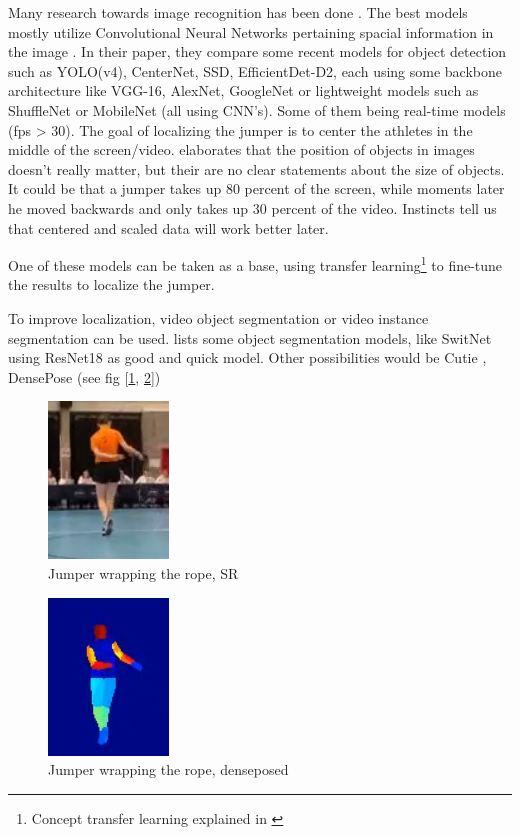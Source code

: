 Many research towards image recognition has been done \autocite{Zou_2023}. The best models mostly utilize Convolutional Neural Networks pertaining spacial information in the image \autocite{Zaidi_2021}. In their paper, they compare some recent models for object detection such as YOLO(v4), CenterNet, SSD, EfficientDet-D2, each using some backbone architecture like VGG-16, AlexNet, GoogleNet or lightweight models such as ShuffleNet or MobileNet (all using CNN's). Some of them being real-time models (fps > 30).
The goal of localizing the jumper is to center the athletes in the middle of the screen/video. \textcite{Bharadiya_2023} elaborates that the position of objects in images doesn't really matter, but their are no clear statements about the size of objects. It could be that a jumper takes up 80 percent of the screen, while moments later he moved backwards and only takes up 30 percent of the video. Instincts tell us that centered and scaled data will work better later.

One of these models can be taken as a base, using transfer learning\footnote{Concept transfer learning explained in \autocite{Bharadiya_2023}} to fine-tune the results to localize the jumper.

To improve localization, video object segmentation or video instance segmentation can be used. \textcite{Gao_2022} lists some object segmentation models, like SwitNet \textcite{Wang_2021} using ResNet18 as good and quick model.
Other possibilities would be Cutie \autocite{Cheng_2023}, DensePose (see fig [\ref{fig:srwrap}, \ref{fig:srwrapdense}]) \autocite{Guler_2018}

\begin{figure}
    \centering
    \includegraphics[width=0.3\linewidth]{img/sr_wrap}
    \caption{Jumper wrapping the rope, SR}
    \label{fig:srwrap}
\end{figure}

\begin{figure}
    \centering
    \includegraphics[width=0.3\linewidth]{img/sr_wrap_dense}
    \caption{Jumper wrapping the rope, denseposed}
    \label{fig:srwrapdense}
\end{figure}

